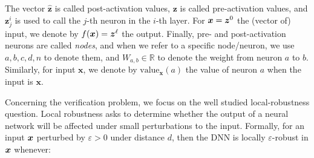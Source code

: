 \documentclass[runningheads]{llncs}
\newcommand{\val}{{\textrm{value}}}
\begin{document}
The vector $\hat{\boldsymbol{z}}$ is called post-activation values, 
$\boldsymbol{z}$ is called pre-activation values, 
and $\boldsymbol{z}^{i}_j$ is used to call the $j$-th neuron in the $i$-th layer. 
For $\boldsymbol{x}={\bm{z}}^0$ the (vector of) input, we denote by $f(\boldsymbol{x})={\bm{z}}^\ell$ the output. Finally, pre- and post-activation neurons are called \emph{nodes}, and when we refer to a specific node/neuron, we use $a,b,c,d,n$ to denote them, and $W_{a,b} \in \mathbb{R}$ to denote the weight from neuron $a$ to $b$. Similarly, for input $\boldsymbol{x}$, we denote by $\val_{\boldsymbol{x}}(a)$ the value of neuron $a$ when the input is $\boldsymbol{x}$. 



\iffalse
and the $i$-th hidden layer is a vector in $\mathbb{R}^{d_i}$, 
and the output layer is a vector in $\mathbb{R}^{d'}$ or a scale. 
The weights, bias and activation functions decide propagate the from previous to the next layer. In formula, from layer $l_{i-1}$ to layer $l_{i}$, the weight 
$\boldsymbol{W}^i$ is matrix of $d_i\times d_{i-1}$, 
the bias is a vector $\vb^i$ in $\mathbb{R}^{d_i}$, and the activation function 
is $\sigma$, then  if the $i-1$-th layer is $\hat{\boldsymbol{z}}^{(i-1)}$, 
then the value of $i$-th layer is computed by: 
\begin{align*}
	{\boldsymbol{z}}^{i} &= \boldsymbol{W}^i\cdot \hat{\boldsymbol{z}}^{(i-1)}+ \vb^i\\
	\hat{\boldsymbol{z}}^{i}(n) &= \sigma({\boldsymbol{z}}^i(n)).
\end{align*} The vector $\hat{\boldsymbol{z}}$ is called post-activation values, and $\boldsymbol{z}$ is called pre-activation values, and $\boldsymbol{z}^{(i)}_j$ is used to call the $j$-th neuron in the $i$-th layer. In our style, we also call neurons \emph{nodes} and use $a,b,c,d$ to denote them. We use $W_{ab}$ to denote the weight from neuron $b$ to $a$. We use $\boldsymbol{x}$ to denote the vector of input and  $f(\boldsymbol{x})$ to denote the output.
\fi

\medskip

Concerning the verification problem, we focus on the well studied local-robustness question. Local robustness asks to determine whether the output of a neural network will be affected under small perturbations to the input. 
Formally, for an input ${\bm{x}}$ perturbed by $\varepsilon >0$ under distance $d$, then the DNN is locally $\varepsilon$-robust in ${\bm{x}}$ whenever:
\end{document}
